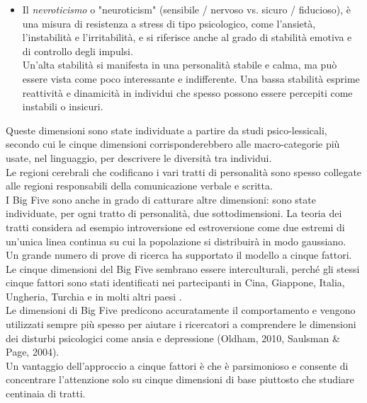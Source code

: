 \begin{itemize}
	\item Il \emph{nevroticismo} o "neuroticism" (sensibile / nervoso vs. sicuro / fiducioso), è una misura di resistenza a stress di tipo psicologico, come l'ansietà, l'instabilità e l'irritabilità, e si riferisce anche al grado di stabilità emotiva e di controllo degli impulsi.\\
	Un'alta stabilità si manifesta in una personalità stabile e calma, ma può essere vista come poco interessante e indifferente. Una bassa stabilità esprime reattività e dinamicità in individui che spesso possono essere percepiti come instabili o insicuri. 
\end{itemize}
Queste dimensioni sono state individuate a partire da studi psico-lessicali, secondo cui le cinque dimensioni corrisponderebbero alle macro-categorie più usate, nel linguaggio, per descrivere le diversità tra individui.\\
Le regioni cerebrali che codificano i vari tratti di personalità sono spesso collegate alle regioni responsabili della comunicazione verbale e scritta. \\
I Big Five sono anche in grado di catturare altre dimensioni: sono state individuate, per ogni tratto di personalità, due sottodimensioni.
La teoria dei tratti considera ad esempio introversione ed estroversione come due estremi di un'unica linea continua su cui la popolazione si distribuirà in modo gaussiano.\\
Un grande numero di prove di ricerca ha supportato il modello a cinque fattori. Le cinque dimensioni del Big Five sembrano essere interculturali, perché gli stessi cinque fattori sono stati identificati nei partecipanti in Cina, Giappone, Italia, Ungheria, Turchia e in molti altri paesi \cite{triandis2002cultural}.\\ 
Le dimensioni di Big Five predicono accuratamente il comportamento e vengono utilizzati sempre più spesso per aiutare i ricercatori a comprendere le dimensioni dei disturbi psicologici come ansia e depressione (Oldham, 2010, Saulsman \& Page, 2004)\cite{saulsman2004five}.\\
Un vantaggio dell'approccio a cinque fattori è che è parsimonioso e consente di concentrare l'attenzione solo su cinque dimensioni di base piuttosto che studiare centinaia di tratti.
